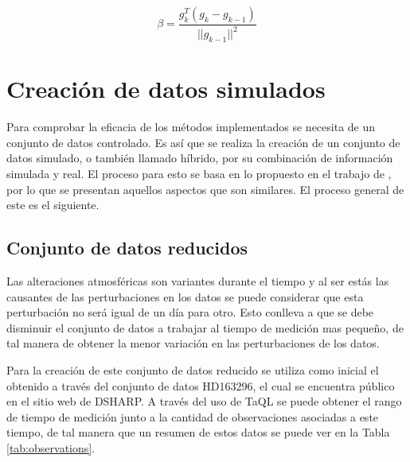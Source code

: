 \begin{equation}
    \label{eq:rebiere_polyak}
    \beta = \frac{g^{T}_{k}(g_{k} - g_{k-1})}{||g_{k-1}||^{2}}
\end{equation}

\section{Creación de datos simulados}
\label{sec:simulated_data}

Para comprobar la eficacia de los métodos implementados se necesita de un conjunto de datos controlado. Es así que se realiza la creación de un conjunto de datos simulado, o también llamado híbrido, por su combinación de información simulada y real. El proceso para esto se basa en lo propuesto en el trabajo de \citet{FernandezTesis}, por lo que se presentan aquellos aspectos que son similares. El proceso general de este es el siguiente.

\subsection{Conjunto de datos reducidos}
\label{sec:datos_reducidos}

Las alteraciones atmosféricas son variantes durante el tiempo y al ser estás las causantes de las perturbaciones en los datos se puede considerar que esta perturbación no será igual de un día para otro. Esto conlleva a que se debe disminuir el conjunto de datos a trabajar al tiempo de medición mas pequeño, de tal manera de obtener la menor variación en las perturbaciones de los datos. 

Para la creación de este conjunto de datos reducido se utiliza como inicial el obtenido a través del conjunto de datos HD163296, el cual se encuentra público en el sitio web de DSHARP. A través del uso de TaQL se puede obtener el rango de tiempo de medición junto a la cantidad de observaciones asociadas a este tiempo, de tal manera que un resumen de estos datos se puede ver en la Tabla \ref{tab:observations}. 

